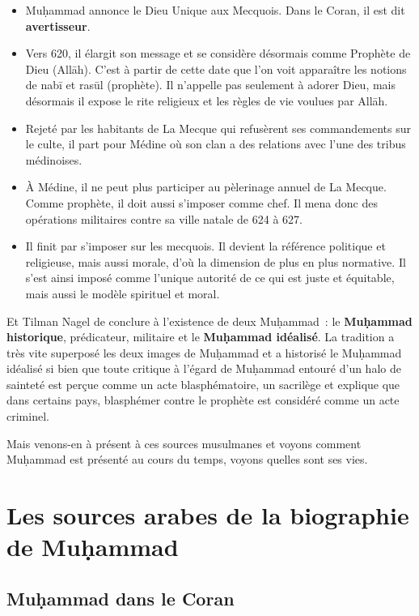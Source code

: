 \begin{itemize}
\item
  Muḥammad annonce le Dieu Unique aux Mecquois. Dans le Coran, il est
  dit \textbf{avertisseur}.
\item
  Vers 620, il élargit son message et se considère désormais comme
  Prophète de Dieu (Allāh). C'est à partir de cette date que l'on voit
  apparaître les notions de nabī et rasūl (prophète). Il n'appelle pas
  seulement à adorer Dieu, mais désormais il expose le rite religieux et
  les règles de vie voulues par Allāh.
\item
  Rejeté par les habitants de La Mecque qui refusèrent ses commandements
  sur le culte, il part pour Médine où son clan a des relations avec
  l'une des tribus médinoises.
\item
  À Médine, il ne peut plus participer au pèlerinage annuel de La
  Mecque. Comme prophète, il doit aussi s'imposer comme chef. Il mena
  donc des opérations militaires contre sa ville natale de 624 à 627.
\item
  Il finit par s'imposer sur les mecquois. Il devient la référence
  politique et religieuse, mais aussi morale, d'où la dimension de plus
  en plus normative. Il s'est ainsi imposé comme l'unique autorité de ce
  qui est juste et équitable, mais aussi le modèle spirituel et moral.
\end{itemize}

Et Tilman Nagel de conclure à l'existence de deux Muḥammad~: le
\textbf{Muḥammad historique}, prédicateur, militaire et le
\textbf{Muḥammad idéalisé}. La tradition a très vite superposé les deux
images de Muḥammad et a historisé le Muḥammad idéalisé si bien que toute
critique à l'égard de Muḥammad entouré d'un halo de sainteté est perçue
comme un acte blasphématoire, un sacrilège et explique que dans certains
pays, blasphémer contre le prophète est considéré comme un acte
criminel.

Mais venons-en à présent à ces sources musulmanes et voyons comment
Muḥammad est présenté au cours du temps, voyons quelles sont ses vies.


\section{Les sources arabes de la biographie de
Muḥammad}
\label{les-sources-arabes-de-la-biographie-de-muux1e25ammad}


\subsection{Muḥammad dans le
Coran}
\label{muux1e25ammad-dans-le-coran}

